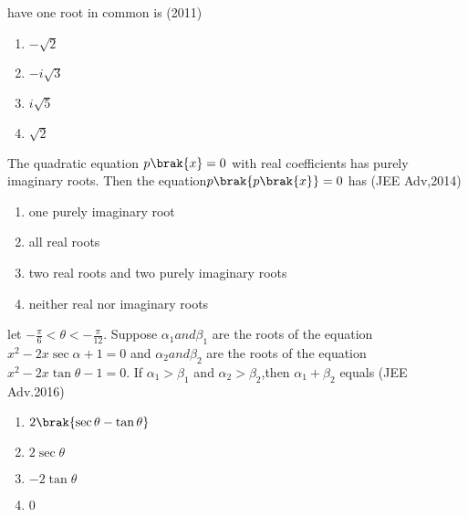 have one root in common is \hfill (2011)
\begin{multicols}{2}
\begin{enumerate}
    \item $-\sqrt{2}$
    \item $-i\sqrt{3}$
    \item $i\sqrt{5}$
    \item $\sqrt{2}$
\end{enumerate}
    
\end{multicols}
\item The quadratic equation $p\brak{x}=0$ with real coefficients has purely imaginary roots. Then the equation$p\brak{p\brak{x}}=0$ has \hfill (JEE Adv,2014)
\begin{enumerate}
    \item one purely imaginary root
    \item all real roots
    \item two real roots and two purely imaginary roots 
    \item neither real nor imaginary roots
\end{enumerate}
\item let $-\frac{\pi}{6}<\theta<-\frac{\pi}{12}$. Suppose $\alpha_{1}and\beta_{1}$ are the roots of the equation $x^{2}-2x\sec \alpha+1=0$ and $\alpha_{2}and\beta_{2}$ are the roots of the equation $x^{2}-2x\tan \theta-1=0$. If $\alpha_{1}>\beta_{1}$ and $\alpha_{2}>\beta_{2}$,then $\alpha_{1}+\beta_{2}$ equals \hfill (JEE Adv.2016)
\begin{enumerate}
    \item $2\brak{\sec\theta-\tan\theta}$
    \item $2\sec\theta$
    \item $-2\tan\theta$
    \item 0
    
\end{enumerate}

